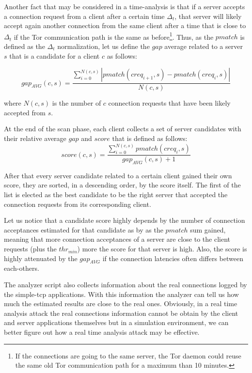 Another fact that may be considered in a time-analysis is that if a server accepts a
connection request from a client after a certain time $\Delta_t$, that
server will likely accept again another connection from the same client
after a time that is close to $\Delta_t$ if the Tor communication path is the same as
before\footnote{If the connections are going to the same server, the Tor
daemon could reuse the same old Tor communication path for a maximum
than 10 minutes\cite{tormanual}.}. 
Thus, as the $pmatch$ is defined as the $\Delta_t$ normalization, 
let us define the $gap$ average related to a
server $s$ that is a candidate for a client $c$ as follows:

\begin{equation}
\label{eq:gap}
 gap_{AVG}(c,s) = \frac{\sum_{i=0}^{N(c,s)} | pmatch(creq_{i+1},s) -
pmatch(creq_{i},s)
|}{N(c,s)}
\end{equation}

where $N(c,s)$ is the number of $c$ connection requests that have been likely
accepted from $s$.


At the end of the scan phase, each client collects a set of server
candidates with their relative average $gap$ and $score$ that is defined
as follows:
\begin{equation}
	score(c,s) = \frac{\sum_{i=0}^{N(c,s)} pmatch(creq_{i},s)}{gap_{AVG}(c,s) + 1}
\end{equation}

After that every server candidate related to a certain client gained
their own score, they are sorted, in a descending order, by the score
itself. The first of the list is elected as the best candidate to be the
right server that accepted the connection requests from its corresponding
client.

Let us notice that a candidate score highly depends by the number of connection
acceptances estimated for that candidate as by as the $pmatch$ sum gained,
meaning that more connection acceptances of a server are close to the client
requests (plus the $thr_{min}$) more the score for that server is high.
Also, the score is highly attenuated by the $gap_{AVG}$ if the connection
latencies often differs between each-others.


The analyzer script also collects information about the
real connections logged by the simple-tcp applications. With this
information the analyzer can tell us how much the estimated results are
close to the real ones. Obviously, in a real time analysis attack the real connections
information cannot be obtain by the client and server applications themselves 
but in a simulation environment, we can better figure out how a real
time analysis attack may be effective.

